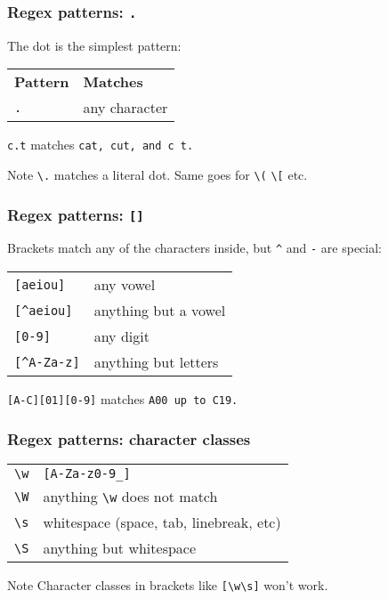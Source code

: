 \begin{frame}[fragile]
\frametitle{Regex patterns: \tt{.}}
The dot is the simplest pattern:
\begin{table}
    \centering
    \begin{tabular}{ll}
        \textbf{Pattern}    & \textbf{Matches} \\
        \verb|.|            & any character \\
    \end{tabular}
\end{table}

\begin{example}
    \verb|c.t| matches \tt{cat}, \tt{cut}, and \tt{c t}.
\end{example}

\begin{block}{Note}
    \verb|\.| matches a literal dot. Same goes for \verb|\(| \verb|\[| etc.
\end{block}
\end{frame}

\begin{frame}[fragile]
\frametitle{Regex patterns: \tt{[]}}
Brackets match any of the characters inside, but \verb|^| and \verb|-| are special:
\begin{table}
    \centering
    \begin{tabular}{ll}
        \verb|[aeiou]|      & any vowel \\
        \verb|[^aeiou]|     & anything but a vowel \\
        \verb|[0-9]|        & any digit \\
        \verb|[^A-Za-z]|    & anything but letters \\
    \end{tabular}
\end{table}

\begin{example}
    \verb|[A-C][01][0-9]| matches \tt{A00} up to \tt{C19}.
\end{example}
\end{frame}

\begin{frame}[fragile]
\frametitle{Regex patterns: character classes}
\begin{table}
    \centering
    \begin{tabular}{ll}
        \verb|\w|           & \verb|[A-Za-z0-9_]| \\
        \verb|\W|           & anything \verb|\w| does not match \\
        \verb|\s|           & whitespace (space, tab, linebreak, etc) \\
        \verb|\S|           & anything but whitespace \\
    \end{tabular}
\end{table}

\begin{block}{Note}
    Character classes in brackets like \verb|[\w\s]| won't work.
\end{block}
\end{frame}

